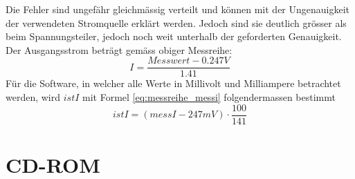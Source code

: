 Die Fehler sind ungefähr gleichmässig verteilt und können mit der Ungenauigkeit der verwendeten Stromquelle erklärt werden. Jedoch sind sie deutlich grösser als beim Spannungsteiler, jedoch noch weit unterhalb der geforderten Genauigkeit. Der Ausgangsstrom beträgt gemäss obiger Messreihe:
\begin{equation}
	I=\frac{Messwert-0.247V}{1.41}
\label{eq:messreihe_messi}
\end{equation}
Für die Software, in welcher alle Werte in Millivolt und Milliampere betrachtet werden, wird $istI$ mit Formel \ref{eq:messreihe_messi} folgendermassen bestimmt
\begin{equation}
	istI=\left(messI-247mV\right)\cdot\frac{100}{141}
\label{eq:messreihe_messi_sw}
\end{equation}


\newpage
\section{CD-ROM}
